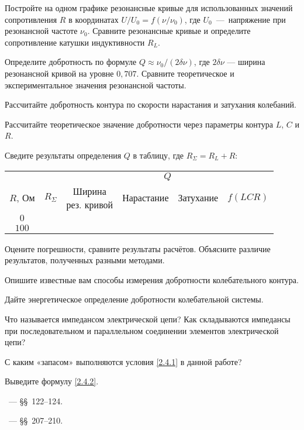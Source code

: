 \begin{lab:task}

	\item Постройте на одном графике резонансные кривые для использованных значений
    сопротивления $R$ в координатах $U/U_0 = f(\nu/\nu_0)$, 
    где $U_0$~---~напряжение при резонансной частоте $\nu_0$.
    Сравните резонансные кривые и определите сопротивление катушки индуктивности
    $R_L$.
    \item Определите добротность по формуле $Q \approx \nu_0/(2\delta\nu)$,
    где $2\delta \nu$ --- ширина резонансной кривой на уровне $0,707$.
    Сравните теоретическое и экспериментальное значения резонансной частоты.

	\item Рассчитайте добротность контура по скорости нарастания и затухания
колебаний.

	\item Рассчитайте теоретическое значение добротности через параметры
контура $L$, $C$ и $R$.

\item Сведите результаты определения $Q$ в таблицу, где $R_{\Sigma}=R_L+R$:
\begin{center}\small
\begin{tabular}{|c|c|c|c|c|c|}
\hline
& & \multicolumn{4}{c|}{$Q$}\\
\cline{3-6}
$R$, Ом & $R_{\Sigma}$ & 
\parbox{2cm}{Ширина\\[-4pt] рез. кривой} & Нарастание & Затухание &$f(LCR)$\\
\hline
$0$ & & & & & \\
$100$ & & & & &\\
\hline
\end{tabular}
\end{center}
%
	\item Оцените погрешности, сравните результаты расчётов. Объясните
    различие результатов, полученных разными методами.
\end{lab:task}


\begin{lab:questions}
    \item Опишите известные вам способы измерения добротности колебательного контура.
    \item Дайте энергетическое определение добротности колебательной системы.
    \item Что называется импедансом электрической цепи?
        Как складываются импедансы при последовательном и параллельном
        соединении элементов электрической цепи?
    \item С каким «запасом» выполняются условия \eqref{2.4.1} в данной работе?
    \item Выведите формулу \eqref{2.4.2}.
\end{lab:questions}


\begin{lab:literature}
	\item \SivuhinIII~--- \S\S~122--124.

	\item \Kalashnikov~--- \S\S~207--210.
\end{lab:literature}
